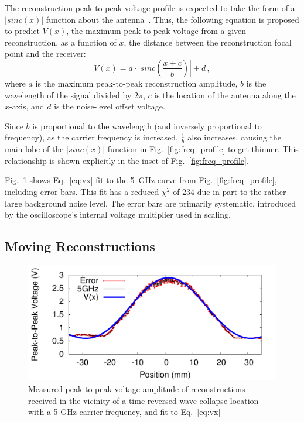 The reconstruction peak-to-peak voltage profile is expected to take the form of
a $\left|sinc(x)\right|$ function about the antenna~\cite{lerosey-focusing}.
%
Thus, the following equation is proposed to predict $V(x)$, the maximum
peak-to-peak voltage from a given reconstruction, as a function of $x$, the
distance between the reconstruction focal point and the receiver:
%
\begin{equation}\label{eq:vx}
V(x)=a\cdot \left|sinc\left(\frac{x+c}{b}\right)\right|+d\,,
\end{equation}
%
\noindent where $a$ is the maximum peak-to-peak reconstruction amplitude, $b$ is
the wavelength of the signal divided by $2\pi$, $c$ is the location of the
antenna along the $x$-axis, and $d$ is the noise-level offset voltage.



Since $b$ is proportional to the wavelength (and inversely proportional to
frequency), as the carrier frequency is increased, $\frac{1}{b}$ also increases,
causing the main lobe of the $\left|sinc(x)\right|$ function in
Fig.~\ref{fig:freq_profile} to get thinner.
%
This relationship is shown explicitly in the inset of
Fig.~\ref{fig:freq_profile}.



Fig.~\ref{fig:error_fit} shows Eq.~\ref{eq:vx} fit to the 5~GHz curve from
Fig.~\ref{fig:freq_profile}, including error bars.
%
This fit has a reduced $\chi^2$ of $234$ due in part to the rather
large background noise level.
%
The error bars are primarily systematic, introduced by the oscilloscope's internal
voltage multiplier used in scaling.

\subsection{Moving Reconstructions}
\label{sec:moving}


\begin{figure}[t!]
\includegraphics[width=\columnwidth]{figs/fit.pdf}
\caption{Measured peak-to-peak voltage amplitude of reconstructions received in the
vicinity of a time reversed wave collapse location with a 5 GHz carrier
frequency, and fit to Eq.~\ref{eq:vx}}
\label{fig:error_fit}
\end{figure}


